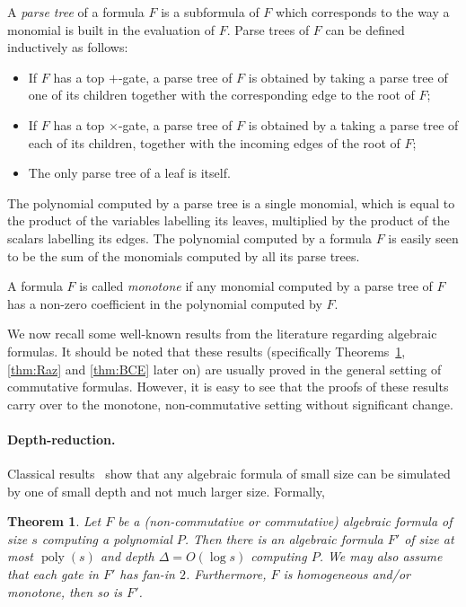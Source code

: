 \documentclass[10pt,a4paper]{article}
\newtheorem{theorem}{Theorem}
\newcommand{\poly}{\mathop{\mathrm{poly}}}
\begin{document}
A \emph{parse tree} of a formula $F$ is a subformula of $F$ which corresponds to the way a monomial is built in the evaluation of $F$.
Parse trees of $F$ can be defined inductively as follows:
\begin{itemize}
\item If $F$ has a top $+$-gate,
a parse tree of $F$ is obtained by taking a parse tree of one of its children together with the corresponding edge to the root of $F$;
\item If $F$ has a top $\times$-gate,
a parse tree of $F$ is obtained by a taking a parse tree of each of its children, together with the incoming edges of the root of $F$;
\item The only parse tree of a leaf is itself.
\end{itemize}
The polynomial computed by a parse tree is a single monomial, which
is equal to the product of the variables labelling its leaves, multiplied
by the product of the scalars labelling its edges.
The polynomial computed by a formula $F$ is easily seen to be the sum of the monomials computed by all its parse trees.

A formula $F$ is called \emph{monotone} if any monomial computed by a parse tree of $F$ has a non-zero coefficient
in the polynomial computed by $F$. 


We now recall some well-known results from the literature regarding algebraic formulas. It should be noted that these results (specifically Theorems~\ref{thm:standardDR}, \ref{thm:Raz} and \ref{thm:BCE} later on) are usually proved in the general setting of commutative formulas. However, it is easy to see that the proofs of these results carry over to the monotone, non-commutative setting without significant change.

\paragraph{Depth-reduction.} Classical results~\cite{BKM,Brent} show that any algebraic formula of small size can be simulated by one of small depth and not much larger size. Formally, 


\begin{theorem}
\label{thm:standardDR}
 Let $F$ be a (non-commutative or commutative) algebraic formula of size $s$ computing a polynomial $P$. Then there is an algebraic formula $F'$ of size at most $\poly(s)$ and depth $\Delta = O(\log s)$ computing $P$. We may also assume that each gate in $F'$ has fan-in $2$. Furthermore, $F$ is homogeneous and/or monotone, then so is $F'$.
\end{theorem}
\end{document}
